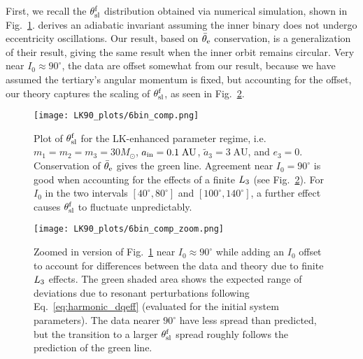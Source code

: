 \documentclass[
        twocolumn,
        twocolappendix
    ]{aastex63}
\begin{document}
First, we recall the $\theta_{\rm sl}^{\rm f}$ distribution obtained via
numerical simulation, shown in Fig.~\ref{fig:bin_comp}. \citet{bin1} derives an
adiabatic invariant assuming the inner binary does not undergo eccentricity
oscillations. Our result, based on $\bar{\theta}_{\rm e}$ conservation, is a
generalization of their result, giving the same result when the inner orbit
remains circular. Very near $I_0 \approx 90^\circ$, the data are offset somewhat
from our result, because we have assumed the tertiary's angular momentum is
fixed, but accounting for the offset, our theory captures the scaling of
$\theta_{\rm sl}^{\rm f}$, as seen in Fig.~\ref{fig:bin_comp_zoom}.

\begin{figure}
    \centering
    \texttt{[image: LK90\_plots/6bin\_comp.png]}
    \caption{Plot of $\theta_{\rm sl}^{\rm f}$ for the LK-enhanced parameter
    regime, i.e.\ $m_1 = m_2 = m_3 = 30M_{\odot}$,
    $a_{\rm in} = 0.1\;\mathrm{AU}$, $\tilde{a}_3 = 3\;\mathrm{AU}$, and $e_3
    = 0$. Conservation of $\bar{\theta}_{\rm e}$ gives the green line. Agreement near
    $I_0 = 90^\circ$ is good when accounting for the effects of a finite
    $L_{\rm 3}$ (see Fig.~\ref{fig:bin_comp_zoom}). For $I_0$ in the two
    intervals $[40^\circ, 80^\circ]$ and $[100^\circ, 140^\circ]$, a further
    effect causes $\theta_{\rm sl}^{\rm f}$ to fluctuate
    unpredictably.}\label{fig:bin_comp}
\end{figure}

\begin{figure}
    \centering
    \texttt{[image: LK90\_plots/6bin\_comp\_zoom.png]}
    \caption{Zoomed in version of Fig.~\ref{fig:bin_comp} near $I_0 \approx
    90^\circ$ while adding an $I_0$ offset to account for differences between
    the data and theory due to finite $L_{\rm 3}$ effects. The green shaded
    area shows the expected range of deviations due to resonant perturbations
    following Eq.~\eqref{eq:harmonic_dqeff} (evaluated for the initial system
    parameters). The data nearer $90^\circ$ have less spread than predicted, but
    the transition to a larger $\theta_{\rm sl}^{\rm f}$ spread roughly follows
    the prediction of the green line.}\label{fig:bin_comp_zoom}
\end{figure}
\end{document}
